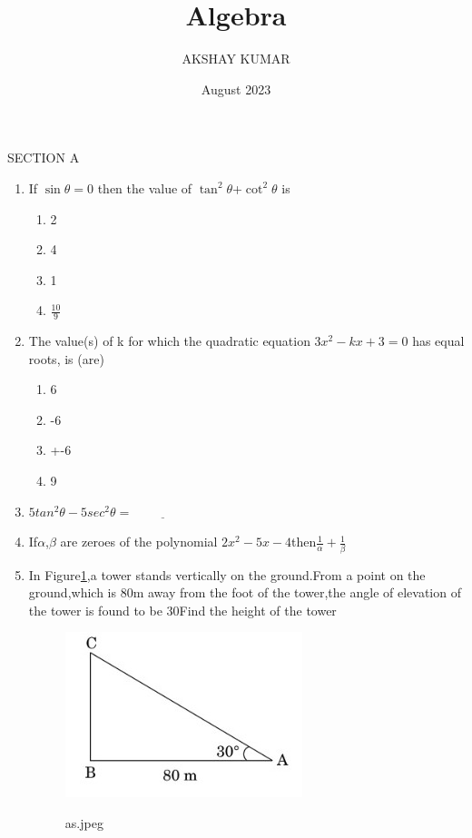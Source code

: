 \documentclass{article}
\title{Algebra }
\author{AKSHAY KUMAR}
\date{August 2023}
\begin{document}
\maketitle

                     {SECTION A}
\begin{enumerate}
    \item If $\sin \theta=0$ then the value of $\tan^2\theta$+$\cot^2\theta$ is
    \begin{enumerate}
        \item 2  \item 4
        \item 1
        \item $\frac{10}{9}$
    \end{enumerate}
    \item The value(s) of k for which the quadratic equation $3x^2-kx+3=0$ has
equal roots, is (are) 
\begin{enumerate}
    \item 6 
    \item -6
    \item +-6
    \item 9
\end{enumerate}
\item $5tan^2 \theta-5sec^2\theta= \underline{\hspace{2cm}}$

 \item If$\alpha$,$\beta$ are zeroes of the polynomial $2x^2-5x-4 $then$\frac{1}{\alpha}+\frac{1}{\beta}$
     \item In Figure\ref{as.jpg},a tower stands vertically on the ground.From a point on the ground,which is 80m away from the foot of the tower,the angle of elevation of the tower is found to be 30\degree Find the height of the tower
\begin{figure}[htbp]
    \centering
    \includegraphics[width=\columnwidth]{figs/as.jpeg}
    \caption{as.jpeg}
    {\label{as.jpg}}
\end{figure}


\end{enumerate}
\end{document}
